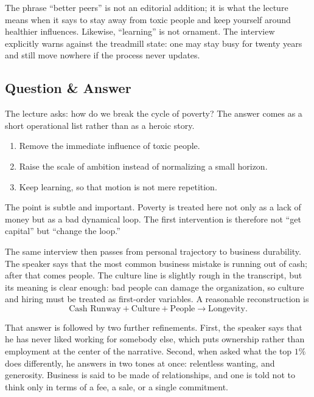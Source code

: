 The phrase ``better peers'' is not an editorial addition; it is what the lecture means when it says to stay away from toxic people and keep yourself around healthier influences. Likewise, ``learning'' is not ornament. The interview explicitly warns against the treadmill state: one may stay busy for twenty years and still move nowhere if the process never updates.

\subsection{Question \& Answer}

The lecture asks: how do we break the cycle of poverty? The answer comes as a short operational list rather than as a heroic story.

\begin{enumerate}
\item Remove the immediate influence of toxic people.
\item Raise the scale of ambition instead of normalizing a small horizon.
\item Keep learning, so that motion is not mere repetition.
\end{enumerate}

The point is subtle and important. Poverty is treated here not only as a lack of money but as a bad dynamical loop. The first intervention is therefore not ``get capital'' but ``change the loop.''

The same interview then passes from personal trajectory to business durability. The speaker says that the most common business mistake is running out of cash; after that comes people. The culture line is slightly rough in the transcript, but its meaning is clear enough: bad people can damage the organization, so culture and hiring must be treated as first-order variables. A reasonable reconstruction is
\begin{equation}
\text{Cash Runway}+\text{Culture}+\text{People} \to \text{Longevity}.
\end{equation}

That answer is followed by two further refinements. First, the speaker says that he has never liked working for somebody else, which puts ownership rather than employment at the center of the narrative. Second, when asked what the top \(1\%\) does differently, he answers in two tones at once: relentless wanting, and generosity. Business is said to be made of relationships, and one is told not to think only in terms of a fee, a sale, or a single commitment.

